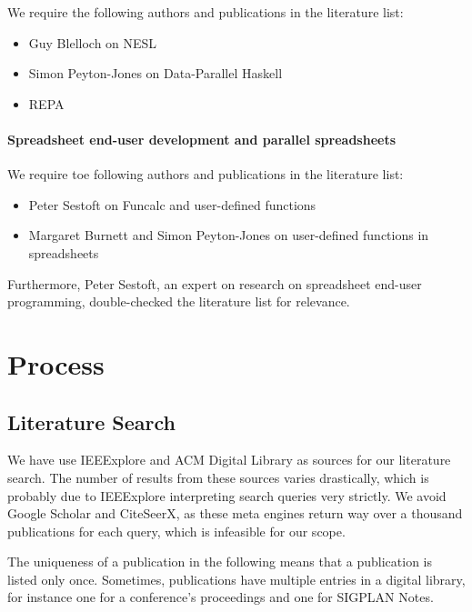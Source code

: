 \documentclass[a4paper]{article}
\begin{document}
We require the following authors and publications in the literature
list:

\begin{itemize}
\item Guy Blelloch on NESL
\item Simon Peyton-Jones on Data-Parallel Haskell
\item REPA
\end{itemize}

\paragraph{Spreadsheet end-user development and parallel spreadsheets}

We require toe following authors and publications in the literature
list:

\begin{itemize}
\item Peter Sestoft on Funcalc and user-defined functions
\item Margaret Burnett and Simon Peyton-Jones on user-defined
  functions in spreadsheets
\end{itemize}

Furthermore, Peter Sestoft, an expert on research on spreadsheet
end-user programming, double-checked the literature list for
relevance.

\section{Process}
\label{sec:process}

\subsection{Literature Search}
\label{sec:literature-search}

We have use IEEExplore and ACM Digital Library as sources for our
literature search. The number of results from these sources varies
drastically, which is probably due to IEEExplore interpreting search
queries very strictly. We avoid Google Scholar and CiteSeerX, as these
meta engines return way over a thousand publications for each query,
which is infeasible for our scope.

The uniqueness of a publication in the following means that a
publication is listed only once. Sometimes, publications have multiple
entries in a digital library, for instance one for a conference's
proceedings and one for SIGPLAN Notes.
\end{document}
